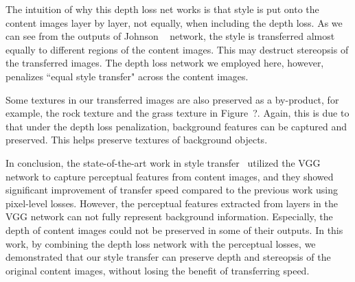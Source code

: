 \documentclass[10pt,twocolumn,letterpaper]{article}
\begin{document}
The intuition of why this depth loss net works is that style is put onto the content images layer by layer, not equally, when including the depth loss. As we can see from the outputs of Johnson \etal~\cite{johnson2016perceptual} network, the style is transferred almost equally to different regions of the content images. This may destruct stereopsis of the transferred images. The depth loss network we employed here, however, penalizes ``equal style transfer" across the content images.  

Some textures in our transferred images are also preserved as a by-product, for example, the rock texture and the grass texture in Figure~?. Again, this is due to that under the depth loss penalization, background features can be captured and preserved. This helps preserve textures of background objects.

In conclusion, the state-of-the-art work in style transfer~\cite{johnson2016perceptual} utilized the VGG network to capture perceptual features from content images, and they showed significant improvement of transfer speed compared to the previous work using pixel-level losses. However, the perceptual features extracted from layers in the VGG network can not fully represent background information. Especially, the depth of content images could not be preserved in some of their outputs. In this work, by combining the depth loss network with the perceptual losses, we demonstrated that our style transfer can preserve depth and stereopsis of the original content images, without losing the benefit of transferring speed. 

{\small


}
\end{document}
